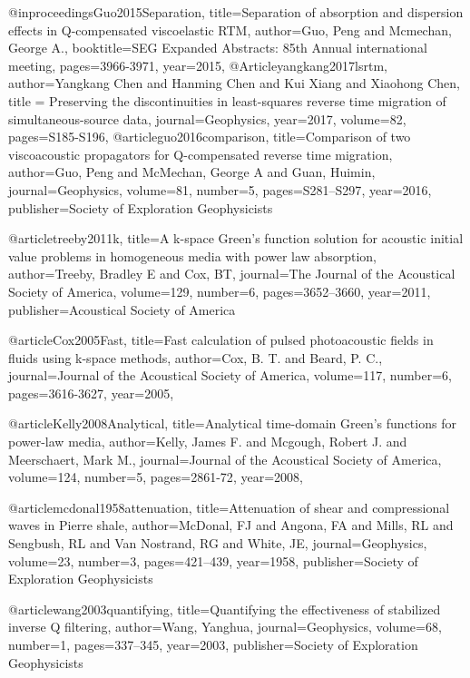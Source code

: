 {@inproceedings{Guo2015Separation,
  title={Separation of absorption and dispersion effects in {Q}-compensated viscoelastic {RTM}},
  author={Guo, Peng and Mcmechan, George A.},
  booktitle={SEG Expanded Abstracts: 85th Annual international meeting},
  pages={3966-3971},
  year={2015},
}
@Article{yangkang2017lsrtm,
  author={Yangkang Chen and Hanming Chen and Kui Xiang and Xiaohong Chen},
  title = {Preserving the discontinuities in least-squares reverse time migration of simultaneous-source data},
  journal={Geophysics},
  year=2017,
  volume=82,
  pages={S185-S196},
}
@article{guo2016comparison,
  title={Comparison of two viscoacoustic propagators for {Q}-compensated reverse time migration},
  author={Guo, Peng and McMechan, George A and Guan, Huimin},
  journal={Geophysics},
  volume={81},
  number={5},
  pages={S281--S297},
  year={2016},
  publisher={Society of Exploration Geophysicists}
}


@article{treeby2011k,
  title={A k-space Green's function solution for acoustic initial value problems in homogeneous media with power law absorption},
  author={Treeby, Bradley E and Cox, BT},
  journal={The Journal of the Acoustical Society of America},
  volume={129},
  number={6},
  pages={3652--3660},
  year={2011},
  publisher={Acoustical Society of America}
}

@article{Cox2005Fast,
  title={Fast calculation of pulsed photoacoustic fields in fluids using k-space methods},
  author={Cox, B. T. and Beard, P. C.},
  journal={Journal of the Acoustical Society of America},
  volume={117},
  number={6},
  pages={3616-3627},
  year={2005},
}

@article{Kelly2008Analytical,
  title={Analytical time-domain Green's functions for power-law media},
  author={Kelly, James F. and Mcgough, Robert J. and Meerschaert, Mark M.},
  journal={Journal of the Acoustical Society of America},
  volume={124},
  number={5},
  pages={2861-72},
  year={2008},
}

@article{mcdonal1958attenuation,
  title={Attenuation of shear and compressional waves in Pierre shale},
  author={McDonal, FJ and Angona, FA and Mills, RL and Sengbush, RL and Van Nostrand, RG and White, JE},
  journal={Geophysics},
  volume={23},
  number={3},
  pages={421--439},
  year={1958},
  publisher={Society of Exploration Geophysicists}
}

@article{wang2003quantifying,
  title={Quantifying the effectiveness of stabilized inverse {Q} filtering},
  author={Wang, Yanghua},
  journal={Geophysics},
  volume={68},
  number={1},
  pages={337--345},
  year={2003},
  publisher={Society of Exploration Geophysicists}
}

}
